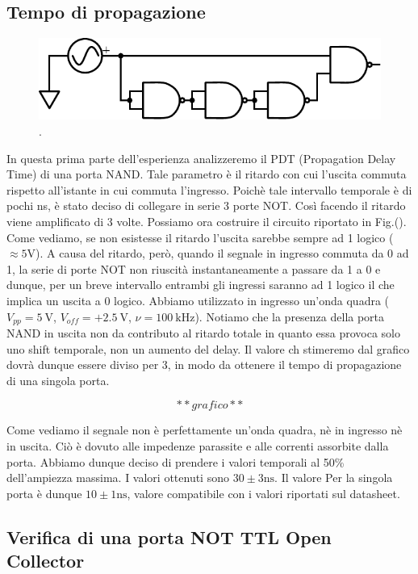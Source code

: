 \subsection{Tempo di propagazione}

\begin{figure}
\centering
\includegraphics[width=.35\textwidth]{../E10/latex/delay.pdf}
\caption{.}
\label{cir10:delay}
\end{figure}


In questa prima parte dell'esperienza analizzeremo il PDT (Propagation Delay Time) di una porta NAND. Tale parametro è il ritardo con cui l'uscita commuta rispetto all'istante in cui commuta l'ingresso. Poichè tale intervallo temporale è di pochi \si{\nano\second}, è stato deciso di collegare in serie 3 porte NOT. Così facendo il ritardo viene amplificato di 3 volte. Possiamo ora costruire il circuito riportato in Fig.(). Come vediamo, se non esistesse il ritardo l'uscita sarebbe sempre ad 1 logico ($\approx 5 \si{\volt}$). A causa del ritardo, però, quando il segnale in ingresso commuta da 0 ad 1, la serie di porte NOT non riuscità instantaneamente a passare da 1 a 0 e dunque, per un breve intervallo entrambi gli ingressi saranno ad 1 logico il che implica un uscita a 0 logico. Abbiamo utilizzato in ingresso un'onda quadra ($V_{pp}=\SI{5}{\volt}$, $V_{off}=+\SI{2.5}{\volt}$, $\nu=\SI{100}{\kilo\hertz}$). Notiamo che la presenza della porta NAND in uscita non da contributo al ritardo totale in quanto essa provoca solo uno shift temporale, non un aumento del delay. Il valore ch stimeremo dal grafico dovrà dunque essere diviso per 3, in modo da ottenere il tempo di propagazione di una singola porta. 

$$**grafico**$$ 


Come vediamo il segnale non è perfettamente un'onda quadra, nè in ingresso nè in uscita. Ciò è dovuto alle impedenze parassite e alle correnti assorbite dalla porta. Abbiamo dunque deciso di prendere i valori temporali al 50\% dell'ampiezza massima. I valori ottenuti sono $30\pm 3 \si{\nano\second}$. Il valore Per la singola porta è dunque $10\pm 1 \si{\nano\second}$, valore compatibile con i valori riportati sul datasheet.


\subsection{Verifica di una porta NOT TTL Open Collector }

